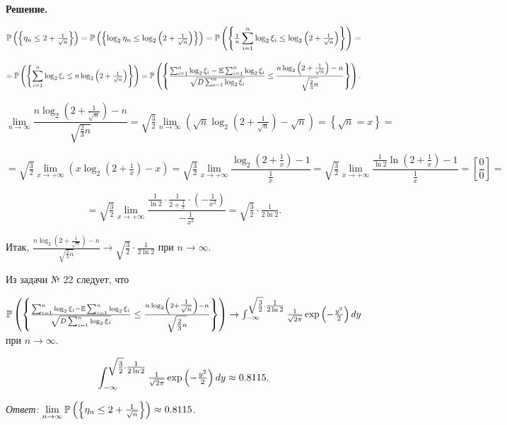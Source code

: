 \textbf{Решение.}

\[{\rm {\mathbb P}}\left(\left\{\eta _{n} \le 2+{\tfrac{1}{\sqrt{n} }} \right\}\right)={\rm {\mathbb P}}\left(\left\{\log _{2} \eta _{n} \le \log _{2} \left(2+{\tfrac{1}{\sqrt{n} }} \right)\right\}\right)={\rm {\mathbb P}}\left(\left\{{\tfrac{1}{n}} \sum _{i=1}^{n}\log _{2} \xi _{i}  \le \log _{2} \left(2+{\tfrac{1}{\sqrt{n} }} \right)\right\}\right)=\] 

\[={\rm {\mathbb P}}\left(\left\{\sum _{i=1}^{n}\log _{2} \xi _{i}  \le n\log _{2} \left(2+{\tfrac{1}{\sqrt{n} }} \right)\right\}\right)={\rm {\mathbb P}}\left(\left\{\frac{\sum _{i=1}^{n}\log _{2} \xi _{i}  -{\rm {\mathbb E}}\sum _{i=1}^{n}\log _{2} \xi _{i}  }{\sqrt{D\sum _{i=1}^{n}\log _{2} \xi _{i}  } } \le \frac{n\log _{2} \left(2+{\tfrac{1}{\sqrt{n} }} \right)-n}{\sqrt{{\tfrac{2}{3}} n} } \right\}\right).\] 

\[\mathop{\lim }\limits_{n\to \infty } \frac{n\log _{2} \left(2+{\tfrac{1}{\sqrt{n} }} \right)-n}{\sqrt{{\tfrac{2}{3}} n} } =\sqrt{{\tfrac{3}{2}} } \mathop{\lim }\limits_{n\to \infty } \left(\sqrt{n} \log _{2} \left(2+{\tfrac{1}{\sqrt{n} }} \right)-\sqrt{n} \right)=\left\{\sqrt{n} =x\right\}=\] 

\[=\sqrt{{\tfrac{3}{2}} } \mathop{\lim }\limits_{x\to +\infty } \left(x\log _{2} \left(2+{\tfrac{1}{x}} \right)-x\right)=\sqrt{{\tfrac{3}{2}} } \mathop{\lim }\limits_{x\to +\infty } \frac{\log _{2} \left(2+{\tfrac{1}{x}} \right)-1}{{\tfrac{1}{x}} } =\sqrt{{\tfrac{3}{2}} } \mathop{\lim }\limits_{x\to +\infty } \frac{{\tfrac{1}{\ln 2}} \ln \left(2+{\tfrac{1}{x}} \right)-1}{{\tfrac{1}{x}} } =\left[\frac{0}{0} \right]=\] 

\[=\sqrt{{\tfrac{3}{2}} } \mathop{\lim }\limits_{x\to +\infty } \frac{{\tfrac{1}{\ln 2}} \cdot {\tfrac{1}{2+{\tfrac{1}{x}} }} \cdot \left(-{\tfrac{1}{x^{2} }} \right)}{-{\tfrac{1}{x^{2} }} } =\sqrt{{\tfrac{3}{2}} } \cdot {\tfrac{1}{2\ln 2}} .\] 

Итак, $\frac{n\log _{2} \left(2+{\tfrac{1}{\sqrt{n} }} \right)-n}{\sqrt{{\tfrac{2}{3}} n} } \to \sqrt{{\tfrac{3}{2}} } \cdot {\tfrac{1}{2\ln 2}} $ при $n\to \infty $.

Из задачи № 22 следует, что

${\rm {\mathbb P}}\left(\left\{\frac{\sum _{i=1}^{n}\log _{2} \xi _{i}  -{\rm {\mathbb E}}\sum _{i=1}^{n}\log _{2} \xi _{i}  }{\sqrt{D\sum _{i=1}^{n}\log _{2} \xi _{i}  } } \le \frac{n\log _{2} \left(2+{\tfrac{1}{\sqrt{n} }} \right)-n}{\sqrt{{\tfrac{2}{3}} n} } \right\}\right)\to \int _{-\infty }^{\sqrt{{\tfrac{3}{2}} } \cdot {\tfrac{1}{2\ln 2}} }{\tfrac{1}{\sqrt{2\pi } }} \exp \left(-{\tfrac{y^{2} }{2}} \right)dy $ при $n\to \infty $.

\[\int _{-\infty }^{\sqrt{{\tfrac{3}{2}} } \cdot {\tfrac{1}{2\ln 2}} }{\tfrac{1}{\sqrt{2\pi } }} \exp \left(-{\tfrac{y^{2} }{2}} \right)dy \approx {\rm 0.8115}.\] 

\textit{Ответ:} $\mathop{\lim }\limits_{n\to \infty } {\rm {\mathbb P}}\left(\left\{\eta _{n} \le 2+{\tfrac{1}{\sqrt{n} }} \right\}\right)\approx {\rm 0.8115}$.









